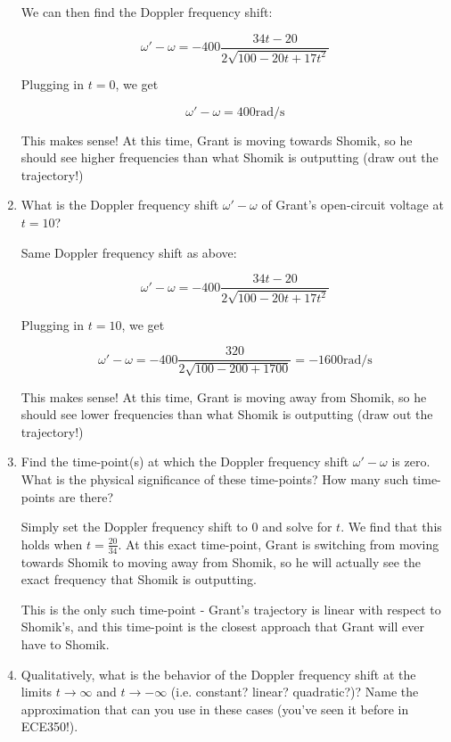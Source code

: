 \documentclass{article}
\begin{document}
\begin{enumerate}[label=(\alph*)]
    We can then find the Doppler frequency shift:

    $$\omega' - \omega = - 400 \frac{34t - 20}{2\sqrt{100 - 20t + 17t^2}}$$

    Plugging in $t = 0$, we get

    $$\boxed{\omega' - \omega = 400 \text{rad/s}}$$

    This makes sense! At this time, Grant is moving towards Shomik, so he should see higher frequencies than what Shomik is outputting (draw out the trajectory!)

    \vfill

    \item What is the Doppler frequency shift $\omega' - \omega$ of Grant's open-circuit voltage at $t = 10$?

    Same Doppler frequency shift as above:

    $$\omega' - \omega = - 400 \frac{34t - 20}{2\sqrt{100 - 20t + 17t^2}}$$

    Plugging in $t = 10$, we get

    $$\boxed{\omega' - \omega = -400 \frac{320}{2 \sqrt{100 - 200 + 1700}} = -1600 \text{rad/s}}$$

    This makes sense! At this time, Grant is moving away from Shomik, so he should see lower frequencies than what Shomik is outputting (draw out the trajectory!)

    \vfill

    \item Find the time-point(s) at which the Doppler frequency shift $\omega' - \omega$ is zero. What is the physical significance of these time-points? How many such time-points are there?

    Simply set the Doppler frequency shift to $0$ and solve for $t$. We find that this holds when $\boxed{t = \frac{20}{34}}$. At this exact time-point, Grant is switching from moving towards Shomik to moving away from Shomik, so he will actually see the exact frequency that Shomik is outputting.

    This is the only such time-point - Grant's trajectory is linear with respect to Shomik's, and this time-point is the closest approach that Grant will ever have to Shomik. 

    \vfill

    \item Qualitatively, what is the behavior of the Doppler frequency shift at the limits $t \longrightarrow \infty$ and $t \longrightarrow -\infty$ (i.e. constant? linear? quadratic?)? Name the approximation that can you use in these cases (you've seen it before in ECE350!).


\end{enumerate}
\end{document}
